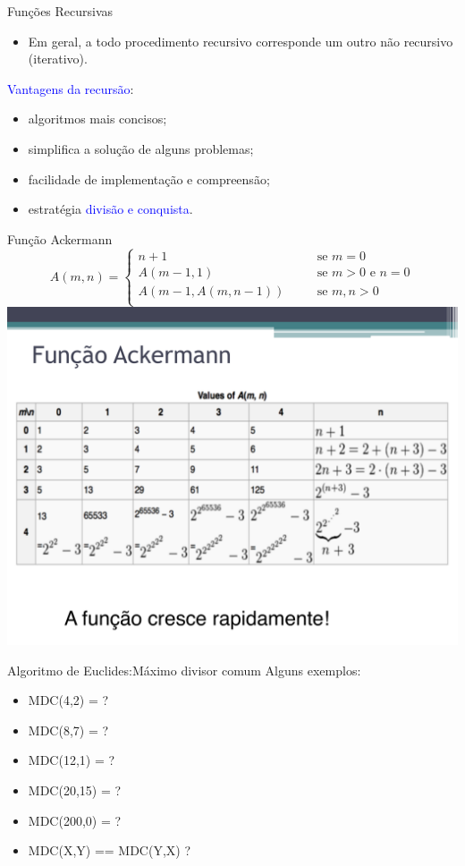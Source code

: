 \documentclass{beamer}
\newcommand{\blue}[1]{\textcolor{blue}{#1}}
\begin{document}
\begin{frame}[fragile]{Funções Recursivas}
\begin{itemize} 
 \item Em geral, a todo procedimento recursivo corresponde um outro não recursivo (iterativo).
 \end{itemize}
\blue{Vantagens da recursão}:
 \begin{itemize}
  \item algoritmos mais concisos;
  \item simplifica a solução de alguns problemas;
  \item facilidade de implementação e compreensão;
  \item estratégia \blue{divisão e conquista}. 
 \end{itemize}



\end{frame}


\begin{frame}[fragile]{Função Ackermann}
\[
A(m,n) = \left\{ 
\begin{array}{lll}
n+1 & \quad& \mbox{se } m=0 \\
A(m-1,1) & \quad& \mbox{se } m>0 \mbox{ e } n=0 \\
A(m-1, A(m,n-1)) & \quad& \mbox{se } m,n> 0 \\
\end{array}
\right.
\]
\includegraphics[scale=0.5]{img/ack}
\end{frame}


\begin{frame}[fragile]{Algoritmo de Euclides:Máximo divisor comum}
Alguns exemplos:
\begin{itemize}
 \item MDC(4,2) = ?
 \item MDC(8,7) = ?
 \item MDC(12,1) = ?
 \item MDC(20,15) = ?
 \item MDC(200,0) = ?
 \item MDC(X,Y) == MDC(Y,X) ?
\end{itemize}

\end{frame}
\end{document}

